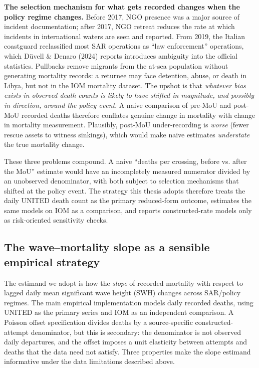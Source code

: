 \documentclass[
  11pt,
  a4paper,
]{article}
\begin{document}
\textbf{The selection mechanism for what gets recorded changes when the
policy regime changes.} Before 2017, NGO presence was a major source of
incident documentation; after 2017, NGO retreat reduces the rate at
which incidents in international waters are seen and reported. From
2019, the Italian coastguard reclassified most SAR operations as ``law
enforcement'' operations, which Düvell \& Denaro (2024) reports
introduces ambiguity into the official statistics. Pullbacks remove
migrants from the at-sea population without generating mortality
records: a returnee may face detention, abuse, or death in Libya, but
not in the IOM mortality dataset. The upshot is that \emph{whatever bias
exists in observed death counts is likely to have shifted in magnitude,
and possibly in direction, around the policy event}. A naive comparison
of pre-MoU and post-MoU recorded deaths therefore conflates genuine
change in mortality with change in mortality measurement. Plausibly,
post-MoU under-recording is \emph{worse} (fewer rescue assets to witness
sinkings), which would make naive estimates \emph{understate} the true
mortality change.

These three problems compound. A naive ``deaths per crossing, before vs.
after the MoU'' estimate would have an incompletely measured numerator
divided by an unobserved denominator, with both subject to selection
mechanisms that shifted at the policy event. The strategy this thesis
adopts therefore treats the daily UNITED death count as the primary
reduced-form outcome, estimates the same models on IOM as a comparison,
and reports constructed-rate models only as risk-oriented sensitivity
checks.

\subsection{The wave--mortality slope as a sensible empirical
strategy}\label{the-wavemortality-slope-as-a-sensible-empirical-strategy}

The estimand we adopt is how the \emph{slope} of recorded mortality with
respect to lagged daily mean significant wave height (SWH) changes
across SAR/policy regimes. The main empirical implementation models
daily recorded deaths, using UNITED as the primary series and IOM as an
independent comparison. A Poisson offset specification divides deaths by
a source-specific constructed-attempt denominator, but this is
secondary: the denominator is not observed daily departures, and the
offset imposes a unit elasticity between attempts and deaths that the
data need not satisfy. Three properties make the slope estimand
informative under the data limitations described above.
\end{document}
